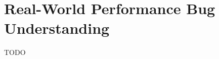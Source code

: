 \chapter[Real-World Performance Bug Understanding]{Real-World Performance Bug Understanding}
\label{chap:study}

TODO


